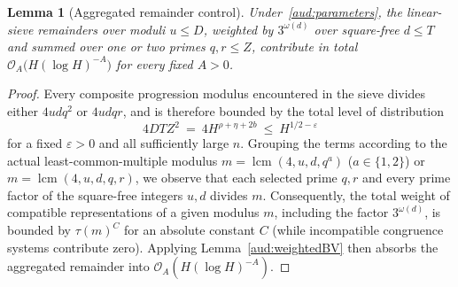 \documentclass[11pt, a4paper]{article}
\theoremstyle{plain}
\newtheorem{lemma}[theorem]{Lemma}
\theoremstyle{definition}
\begin{document}
\begin{lemma}[Aggregated remainder control]\label{aud:remainders}
Under~\eqref{aud:parameters}, the linear-sieve remainders over moduli $u\le D$, weighted by $3^{\omega(d)}$ over square-free $d\le T$ and summed over one or two primes $q,r\le Z$, contribute in total $\mathcal{O}_A\big(H(\log H)^{-A}\big)$ for every fixed $A>0$.
\end{lemma}
\begin{proof}
Every composite progression modulus encountered in the sieve divides either $4udq^{2}$ or $4udqr$, and is therefore bounded by the total level of distribution
\begin{equation}\label{aud:level}
4DTZ^{2}\ =\ 4H^{\rho+\eta+2b}\ \le\ H^{1/2-\varepsilon}
\end{equation}
for a fixed $\varepsilon>0$ and all sufficiently large $n$. Grouping the terms according to the actual least-common-multiple modulus $m=\operatorname{lcm}(4,u,d,q^{a})$ ($a\in\{1,2\}$) or $m=\operatorname{lcm}(4,u,d,q,r)$, we observe that each selected prime $q,r$ and every prime factor of the square-free integers $u,d$ divides $m$. Consequently, the total weight of compatible representations of a given modulus $m$, including the factor $3^{\omega(d)}$, is bounded by $\tau(m)^{C}$ for an absolute constant $C$ (while incompatible congruence systems contribute zero). Applying Lemma~\ref{aud:weightedBV} then absorbs the aggregated remainder into $\mathcal{O}_A(H(\log H)^{-A})$.
\end{proof}
\end{document}
